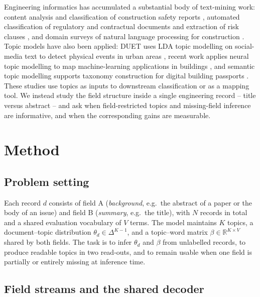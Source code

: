\documentclass[Journal,letterpaper]{ascelike-new}
\begin{document}
Engineering informatics has accumulated a substantial body of text-mining work: content analysis
and classification of construction safety reports \cite{civilsafety2015,civilaccident2018},
automated classification of regulatory and contractual documents and extraction of risk clauses
\cite{compliance2013,ontology2015,contract2022,risknlp2023}, and domain surveys of natural language processing
for construction \cite{civilnlp2021,civilnlp2023}. Topic models have also been applied: DUET uses
LDA topic modelling on social-media text to detect physical events in urban areas \cite{duet2019},
recent work applies neural
topic modelling to map machine-learning applications in buildings \cite{civiltopic2024}, and
semantic topic modelling supports taxonomy construction for digital building passports \cite{passport2026}. These
studies use topics as inputs to downstream classification or as a mapping tool. We instead study
the field structure inside a single engineering record -- title versus abstract -- and ask when
field-restricted topics and missing-field inference are informative, and when the corresponding
gains are measurable.

\section{Method}

\subsection{Problem setting}

Each record $d$ consists of field A (\emph{background}, e.g.\ the abstract of a paper or the body
of an issue) and field B (\emph{summary}, e.g.\ the title), with $N$ records in total and a shared
evaluation vocabulary of $V$ terms. The model maintains $K$ topics, a document--topic distribution
$\theta_d\in\Delta^{K-1}$, and a topic--word matrix $\beta\in\mathbb{R}^{K\times V}$ shared by both
fields. The task is to infer $\theta_d$ and $\beta$ from unlabelled records, to produce readable
topics in two read-outs, and to remain usable when one field is partially or entirely missing at
inference time.

\subsection{Field streams and the shared decoder}
\end{document}
